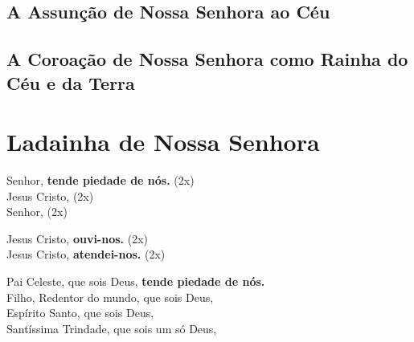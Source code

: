 \documentclass{rosario}
\begin{document}

\TODO


\section{A Assunção de Nossa Senhora ao Céu}




\TODO



\TODO


\section{A Coroação de Nossa Senhora como Rainha do Céu e da Terra}






\TODO


\TODO


\chapter{Ladainha de Nossa Senhora}

Senhor, \textbf{tende piedade de nós.} (2x) \\
Jesus Cristo, (2x) \\
Senhor, (2x)

Jesus Cristo, \textbf{ouvi-nos.} (2x) \\
Jesus Cristo, \textbf{atendei-nos.} (2x)

Pai Celeste, que sois Deus, \textbf{tende piedade de nós.} \\
Filho, Redentor do mundo, que sois Deus, \\
Espírito Santo, que sois Deus, \\
Santíssima Trindade, que sois um só Deus,
\end{document}
